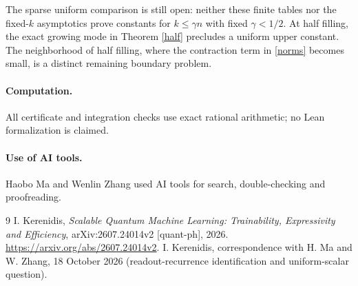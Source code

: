 \documentclass[11pt]{article}
\begin{document}
The sparse uniform comparison is still open: neither these finite tables nor
the fixed-$k$ asymptotics prove constants for $k\leq\gamma n$ with fixed
$\gamma<1/2$. At half filling, the exact growing mode in Theorem \ref{half}
precludes a uniform upper constant. The neighborhood of half filling, where
the contraction term in \eqref{norms} becomes small, is a distinct remaining
boundary problem.

\paragraph{Computation.}
All certificate and integration checks use exact rational arithmetic; no Lean
formalization is claimed.

\paragraph{Use of AI tools.} Haobo Ma and Wenlin Zhang used AI tools for search, double-checking and proofreading.

\begin{thebibliography}{9}
 I. Kerenidis, \emph{Scalable Quantum Machine Learning:
Trainability, Expressivity and Efficiency}, arXiv:2607.24014v2 [quant-ph], 2026.
\url{https://arxiv.org/abs/2607.24014v2}.
 I. Kerenidis, correspondence with H. Ma and W. Zhang,
18 October 2026 (readout-recurrence identification and uniform-scalar question).
\end{thebibliography}
\end{document}
